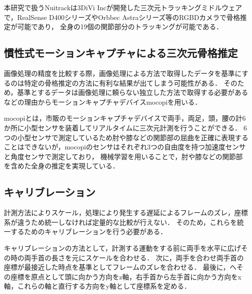\documentclass[titlepage]{jarticle}
\begin{document}
本研究で扱うNuitrackは3DiVi Incが開発した三次元トラッキングミドルウェアで，RealSense D400シリーズやOrbbec Astraシリーズ等のRGBDカメラで骨格推定が可能であり，
全身の19個の関節部分のトラッキングが可能である．
%
%
\subsection{慣性式モーションキャプチャによる三次元骨格推定}
%
画像処理の精度を比較する際，画像処理による方法で取得したデータを基準にするのは特定の骨格推定の方法に有利な結果が出てしまう可能性がある．
そのため，基準とするデータは画像処理に頼らない独立した方法で取得する必要があるなどの理由からモーションキャプチャデバイスmocopi\cite{mocopi}を用いる．

mocopiとは，市販のモーションキャプチャデバイスで両手，両足，頭，腰の計6か所に小型センサを装着してリアルタイムに三次元計測を行うことができる．
6つの小型センサで測定しているため肘や膝などの関節部の屈曲を正確に表現することはできないが，mocopiのセンサはそれぞれ3つの自由度を持つ加速度センサと角度センサで測定しており，
機械学習を用いることで，肘や膝などの関節部を含めた全身の推定を実現している．
%
%
\subsection{キャリブレーション}
%
計測方法によりスケール，処理により発生する遅延によるフレームのズレ，座標系が違うため統一しなければ定量的な比較が行えない．
そのため，これらを統一するためのキャリブレーションを行う必要がある．

キャリブレーションの方法として，計測する運動をする前に両手を水平に広げその時の両手首の長さを元にスケールを合わせる．
次に，両手を合わせ両手首の座標が最接近した時点を基準としてフレームのズレを合わせる．
最後に，へその座標を原点として頭に向かう方向をz軸，右手首から左手首に向かう方向をx軸，これらの軸と直行する方向をy軸として座標系を定める．
%
%
\end{document}
